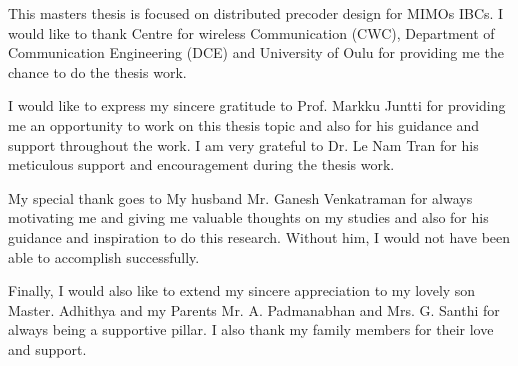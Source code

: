 This masters thesis is focused on distributed precoder design for \acsp{MIMO} \acsp{IBC}. I would like to thank Centre for wireless Communication (CWC), Department of Communication Engineering (DCE) and University of Oulu for providing me the chance to do the thesis work.

I would like to express my sincere gratitude to Prof. Markku Juntti for providing me an opportunity to work on this thesis topic and also for his guidance and support throughout the work.  I am very grateful to Dr. Le Nam Tran for his meticulous support and encouragement during the thesis work. 

My special thank goes to My husband Mr. Ganesh Venkatraman for always motivating me and giving me valuable thoughts on my studies and also for  his guidance and inspiration to do this research. Without him, I would not have been able to  accomplish successfully.
 
Finally, I would also like to extend my sincere appreciation to my lovely son Master. Adhithya and my Parents Mr. A. Padmanabhan and Mrs. G. Santhi for always being a supportive pillar.  I also thank my family members for their love and support.